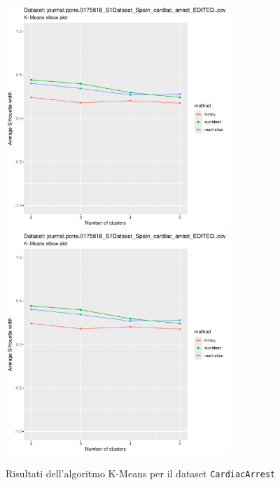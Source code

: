 \documentclass[a4paper, 12pt]{report}
\begin{document}
			\begin{figure}[H]
				\centering
				\includegraphics[width = 0.75\textwidth, height = 0.45\textheight, page = 1]{
					results/results_CardiacArrest.csv.pdf
				}
				\includegraphics[width = 0.75\textwidth, height = 0.45\textheight, page = 2]{
					results/results_CardiacArrest.csv.pdf
				}
				\caption{Risultati dell'algoritmo K-Means per il dataset
				\texttt{CardiacArrest}}
				\label{fig:kmeans2}
			\end{figure}
\end{document}
